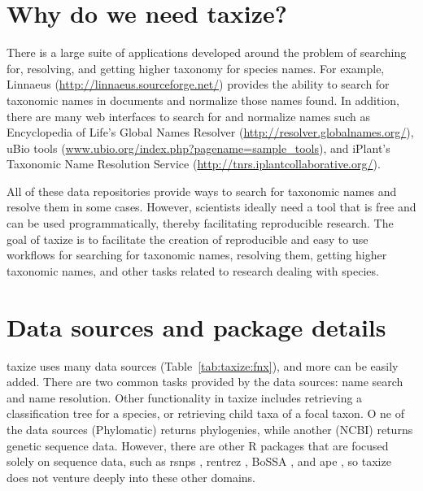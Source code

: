 \begin{sloppypar}
\section{Why do we need taxize?}
\label{sec:taxize:why} 
There is a large suite of applications developed around the problem of searching for, resolving, and getting higher taxonomy for species names. 
For example, Linnaeus (\url{http://linnaeus.sourceforge.net/}) provides the ability to search for taxonomic names in documents and normalize those names found. 
In addition, there are many web interfaces to search for and normalize names such as Encyclopedia of Life's Global Names Resolver (\url{http://resolver.globalnames.org/}), uBio tools (\url{www.ubio.org/index.php?pagename=sample_tools}), and iPlant's Taxonomic Name Resolution Service (\url{http://tnrs.iplantcollaborative.org/}). 

All of these data repositories provide ways to search for taxonomic names and resolve them in some cases. 
However, scientists ideally need a tool that is free and can be used programmatically, thereby facilitating reproducible research. 
The goal of taxize is to facilitate the creation of reproducible and easy to use workflows for searching for taxonomic names, resolving them, getting higher taxonomic names, and other tasks related to research dealing with species.

\section{Data sources and package details}
\label{sec:taxize:sources} 
taxize uses many data sources (Table~\ref{tab:taxize:fnx}), and more can be easily added. 
There are two common tasks provided by the data sources: name search and name resolution. 
Other functionality in taxize includes retrieving a classification tree for a species, or retrieving child taxa of a focal taxon. O
ne of the data sources (Phylomatic) returns phylogenies, while another (NCBI) returns genetic sequence data. 
However, there are other R packages that are focused solely on sequence data, such as rsnps \citep{chamberlain2013}, rentrez \citep{winter2013}, BoSSA \citep{lefeuvre2010}, and ape \citep{paradis2004}, so taxize does not venture deeply into these other domains. 


\end{sloppypar}
